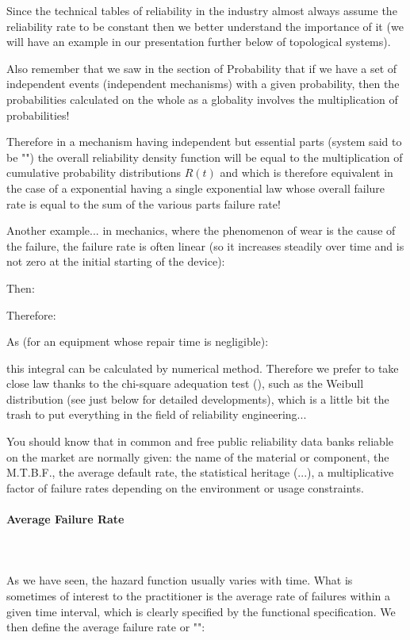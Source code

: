 	Since the technical tables of reliability in the industry almost always assume the reliability rate to be constant then we better understand the importance of it (we will have an example in our presentation further below of topological systems).
	
	Also remember that we saw in the section of Probability that if we have a set of independent events (independent mechanisms) with a given probability, then the probabilities calculated on the whole as a globality involves the multiplication of probabilities!
	
	Therefore in a mechanism having independent but essential parts (system said to be "") the overall reliability density function will be equal to the multiplication of cumulative probability distributions $R (t)$ and which is therefore equivalent in the case of a exponential having a single exponential law whose overall failure rate is equal to the sum of the various parts failure rate!
	
	Another example... in mechanics, where the phenomenon of wear is the cause of the failure, the failure rate is often linear (so it increases steadily over time and is not zero at the initial starting of the device):
	
	Then:
	
	Therefore:
	
	As (for an equipment whose repair time is negligible):
	
	this integral can be calculated by numerical method. Therefore we prefer to take close law thanks to the chi-square adequation test (), such as the Weibull distribution (see just below for detailed developments), which is a little bit the trash to put everything in the field of reliability engineering...
	
	You should know that in common and free public reliability data banks reliable on the market are normally given: the name of the material or component, the M.T.B.F., the average default rate, the statistical heritage (...), a multiplicative factor of failure rates depending on the environment or usage constraints. 
	
	\pagebreak
	\paragraph{Average Failure Rate}\mbox{}\\\\
	As we have seen, the hazard function usually varies with time. What is sometimes of interest to the practitioner is the average rate of failures within a given time interval, which is clearly specified by the functional specification. We then define the average failure rate or "":
	
